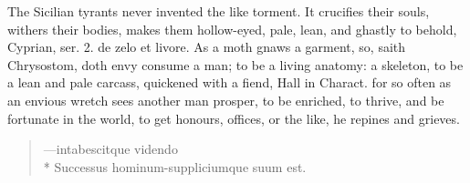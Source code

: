 {The Sicilian tyrants never invented the like torment. It crucifies
their souls, withers their bodies, makes them hollow-eyed, pale,
lean, and ghastly to behold, Cyprian, ser. 2. de zelo et livore.
As a moth gnaws a garment, so, saith Chrysostom, doth envy
consume a man; to be a living anatomy: a skeleton, to be a lean and
pale carcass, quickened with a fiend, Hall in Charact. for
so often as an envious wretch sees another man prosper, to be enriched,
to thrive, and be fortunate in the world, to get honours, offices, or
the like, he repines and grieves.

\begin{verse}
---\textlatin{intabescitque videndo\\*
  Successus hominum-suppliciumque suum est}.
\end{verse}

}
